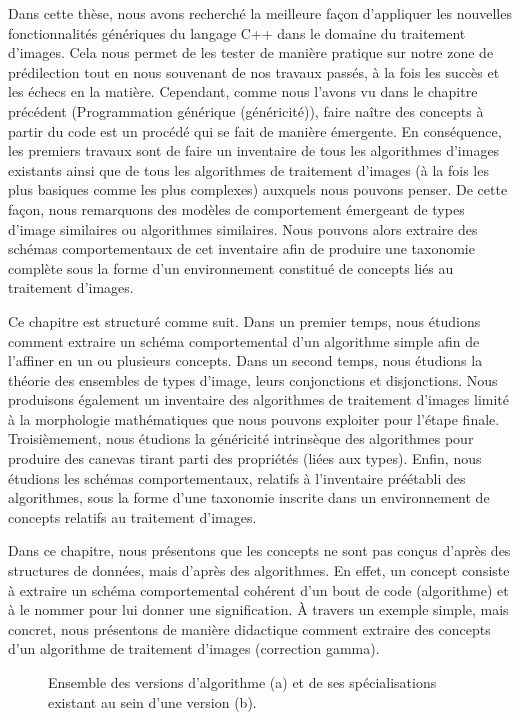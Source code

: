 Dans cette thèse, nous avons recherché la meilleure façon d'appliquer les nouvelles fonctionnalités génériques du
langage C++ dans le domaine du traitement d'images. Cela nous permet de les tester de manière pratique sur notre zone de
prédilection tout en nous souvenant de nos travaux passés, à la fois les succès et les échecs en la matière. Cependant,
comme nous l'avons vu dans le chapitre précédent (Programmation générique (généricité)), faire naître des concepts à
partir du code est un procédé qui se fait de manière émergente. En conséquence, les premiers travaux sont de faire un
inventaire de tous les algorithmes d'images existants ainsi que de tous les algorithmes de traitement d'images (à la
fois les plus basiques comme les plus complexes) auxquels nous pouvons penser. De cette façon, nous remarquons des
modèles de comportement émergeant de types d'image similaires ou algorithmes similaires. Nous pouvons alors extraire des
schémas comportementaux de cet inventaire afin de produire une taxonomie complète sous la forme d'un environnement
constitué de concepts liés au traitement d'images.

Ce chapitre est structuré comme suit. Dans un premier temps, nous étudions comment extraire un schéma comportemental
d'un algorithme simple afin de l'affiner en un ou plusieurs concepts. Dans un second temps, nous étudions la théorie des
ensembles de types d'image, leurs conjonctions et disjonctions. Nous produisons également un inventaire des algorithmes
de traitement d'images limité à la morphologie mathématiques que nous pouvons exploiter pour l'étape finale.
Troisièmement, nous étudions la généricité intrinsèque des algorithmes pour produire des canevas tirant parti des
propriétés (liées aux types). Enfin, nous étudions les schémas comportementaux, relatifs à l'inventaire préétabli des
algorithmes, sous la forme d'une taxonomie inscrite dans un environnement de concepts relatifs au traitement d'images.

Dans ce chapitre, nous présentons que les concepts ne sont pas conçus d'après des structures de données, mais d'après
des algorithmes. En effet, un concept consiste à extraire un schéma comportemental cohérent d'un bout de code
(algorithme) et à le nommer pour lui donner une signification. \`{A} travers un exemple simple, mais concret, nous
présentons de manière didactique comment extraire des concepts d'un algorithme de traitement d'images (correction
gamma).

\begin{figure}[htbp]
  \centering
  \hfil
  \caption[]{Ensemble des versions d'algorithme (a) et de ses spécialisations existant au sein d'une version (b).}
  \label{resume:fig:image.version.vs.specialization}
\end{figure}


